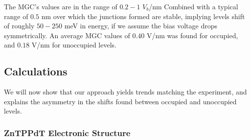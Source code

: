 \documentclass[aip,jcp,a4paper,reprint,floatfix,superscriptaddress]{revtex4-1}
\begin{document}
The MGC's values are 
in the range of $0.2-1$ $V_b$/nm 
Combined with a typical range of $0.5$ nm over which the junctions formed are stable, 
implying levels shift of roughly $50-250$ meV in energy, if we assume the bias voltage  drops symmetrically. An average MGC values of $0.40$ V/nm was found for occupied, and  $0.18$ V/nm for unoccupied levels.


\subsection{Calculations}\label{calculations}

We will now show that our approach yields trends matching the experiment, and explains the asymmetry in the shifts found between occupied and unoccupied levels. 


\subsubsection{ZnTPPdT Electronic Structure}\label{electronic_structure}
\end{document}
